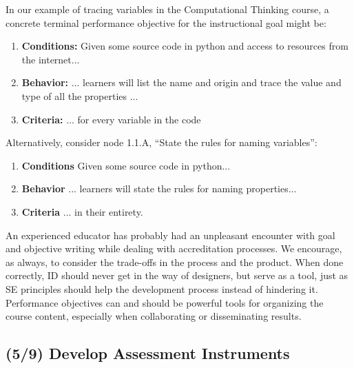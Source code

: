 In our example of tracing variables in the Computational Thinking course, a concrete terminal performance objective for the instructional goal might be:

\begin{enumerate}
\item \textbf{Conditions: } Given some source code in python and access to resources from the internet...
\item \textbf{Behavior: } ... learners will list the name and origin and trace the value and type of all the properties ...
\item \textbf{Criteria: } ... for every variable in the code
\end{enumerate}


Alternatively, consider node 1.1.A, ``State the rules for naming variables'':
 
 \begin{enumerate}
\item \textbf{Conditions} Given some source code in python...
\item \textbf{Behavior} ... learners will state the rules for naming properties...
\item \textbf{Criteria} ... in their entirety.
 \end{enumerate}


An experienced educator has probably had an unpleasant encounter with goal and objective writing while dealing with accreditation processes.
We encourage, as always, to consider the trade-offs in the process and the product.
When done correctly, ID should never get in the way of designers, but serve as a tool, just as SE principles should help the development process instead of hindering it.
Performance objectives can and should be powerful tools for organizing the course content, especially when collaborating or disseminating results.


\subsection{(5/9) Develop Assessment Instruments}

